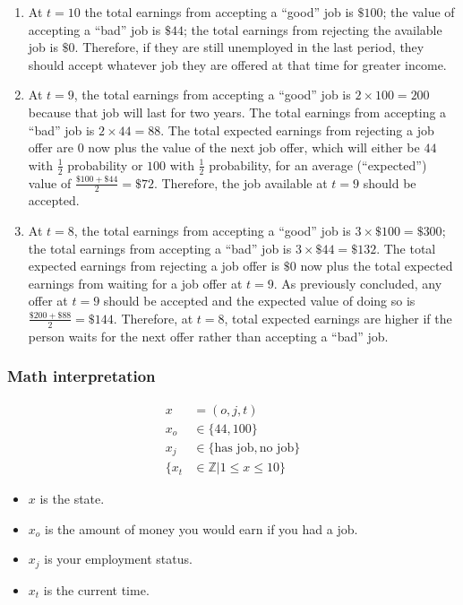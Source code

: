 \documentclass[a4paper, 12pt]{article}
\begin{document}
\begin{enumerate}
  \item At $t = 10$ the total earnings from accepting a ``good'' job is $\$100$; the value of accepting a ``bad'' job is $\$44$; the total earnings from rejecting the available job is $\$0$. Therefore, if they are still unemployed in the last period, they should accept whatever job they are offered at that time for greater income.
  \item At $t = 9$, the total earnings from accepting a ``good'' job is $2 \times 100 = 200$ because that job will last for two years. The total earnings from accepting a ``bad'' job is $2 \times 44 = 88$. The total expected earnings from rejecting a job offer are $0$ now plus the value of the next job offer, which will either be $44$ with $\frac{1}{2}$ probability or $100$ with $\frac{1}{2}$ probability, for an average (``expected'') value of $\frac {\$100+\$44}{2}=\$72$. Therefore, the job available at $t=9$ should be accepted.
  \item At $t=8$, the total earnings from accepting a ``good'' job is $3\times \$100=\$300$; the total earnings from accepting a ``bad'' job is $3\times \$44=\$132$. The total expected earnings from rejecting a job offer is $\$0$ now plus the total expected earnings from waiting for a job offer at $t=9$. As previously concluded, any offer at $t=9$ should be accepted and the expected value of doing so is ${\frac {\$200+\$88}{2}}=\$144$. Therefore, at $t=8$, total expected earnings are higher if the person waits for the next offer rather than accepting a ``bad'' job.
\end{enumerate}

\subsubsection{Math interpretation}

\[
\begin{aligned}
  x &= (o, j, t) \\
  x_{o} &\in \{44, 100\} \\
  x_{j} &\in \{\text{has job}, \text{no job}\} \\
  \{x_{t} &\in \mathbb{Z} | 1 \leq x \leq 10\}
\end{aligned}
\]

\begin{itemize}
  \item $x$ is the state.
  \item $x_{o}$ is the amount of money you would earn if you had a job.
  \item $x_{j}$ is your employment status.
  \item $x_{t}$ is the current time.
\end{itemize}
\end{document}

